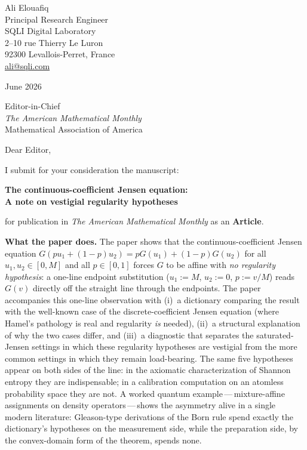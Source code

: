 \documentclass[12pt]{article}
\begin{document}
\noindent
Ali Elouafiq\\
Principal Research Engineer\\
SQLI Digital Laboratory\\
2--10 rue Thierry Le Luron\\
92300 Levallois-Perret, France\\
\href{mailto:ali@sqli.com}{ali@sqli.com}

\bigskip
{} June 2026

\bigskip
\noindent
Editor-in-Chief\\
\textit{The American Mathematical Monthly}\\
Mathematical Association of America

\bigskip
\noindent
Dear Editor,

\medskip
\noindent
I submit for your consideration the manuscript:

\begin{center}
  \textbf{The continuous-coefficient Jensen equation:}\\
  \textbf{A note on vestigial regularity hypotheses}
\end{center}

\noindent
for publication in \textit{The American Mathematical Monthly} as an
\textbf{Article}.

\bigskip
\noindent\textbf{What the paper does.}
The paper shows that the continuous-coefficient Jensen equation
$G(pu_1+(1-p)u_2)=pG(u_1)+(1-p)G(u_2)$ for all $u_1,u_2\in[0,M]$ and
all $p\in[0,1]$ forces $G$ to be affine with \emph{no regularity
hypothesis}: a one-line endpoint substitution ($u_1{:=}M$, $u_2{:=}0$,
$p{:=}v/M$) reads $G(v)$ directly off the straight line through the
endpoints. The paper accompanies this one-line observation with
(i)~a dictionary comparing the result with the well-known case of the
discrete-coefficient Jensen equation (where Hamel's pathology is real
and regularity \emph{is} needed), (ii)~a structural explanation of
why the two cases differ, and (iii)~a diagnostic that separates the
saturated-Jensen settings in which these regularity hypotheses are
vestigial from the more common settings in which they remain
load-bearing. The same five hypotheses appear on both sides of the
line: in the axiomatic characterization of Shannon entropy they are
indispensable; in a calibration computation on an atomless
probability space they are not. A worked quantum
example\,---\,mixture-affine assignments on density
operators\,---\,shows the asymmetry alive in a single modern
literature: Gleason-type derivations of the Born rule spend exactly
the dictionary's hypotheses on the measurement side, while the
preparation side, by the convex-domain form of the theorem, spends
none.
\end{document}
